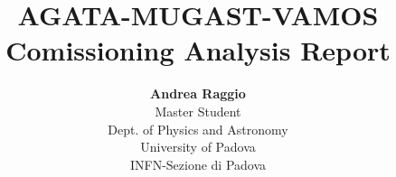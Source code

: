 \documentclass[10pt]{beamer}
\title{AGATA-MUGAST-VAMOS\\ Comissioning Analysis Report }
\institute{}
\author{%
\textbf{Andrea Raggio}\\
\vspace{0.01\textheight}
Master Student\\
Dept. of Physics and Astronomy\\
University of Padova\\
\vspace{0.01\textheight}
INFN-Sezione di Padova\\
}
\date{}
\begin{document}
\frame{\titlepage}





\end{document}
